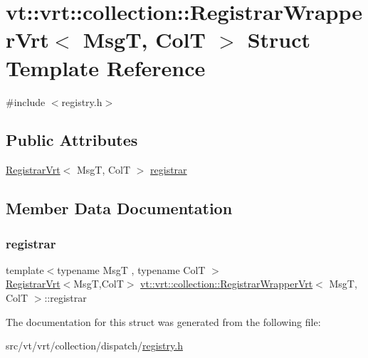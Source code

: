 \hypertarget{structvt_1_1vrt_1_1collection_1_1_registrar_wrapper_vrt}{}\section{vt\+:\+:vrt\+:\+:collection\+:\+:Registrar\+Wrapper\+Vrt$<$ MsgT, ColT $>$ Struct Template Reference}
\label{structvt_1_1vrt_1_1collection_1_1_registrar_wrapper_vrt}


{\ttfamily \#include $<$registry.\+h$>$}

\subsection*{Public Attributes}
\begin{DoxyCompactItemize}
\item 
\hyperlink{structvt_1_1vrt_1_1collection_1_1_registrar_vrt}{Registrar\+Vrt}$<$ MsgT, ColT $>$ \hyperlink{structvt_1_1vrt_1_1collection_1_1_registrar_wrapper_vrt_afc5092f83f5858d4581d93533db68769}{registrar}
\end{DoxyCompactItemize}


\subsection{Member Data Documentation}
\mbox{\label{structvt_1_1vrt_1_1collection_1_1_registrar_wrapper_vrt_afc5092f83f5858d4581d93533db68769}} 
\subsubsection{\texorpdfstring{registrar}{registrar}}
{\footnotesize\ttfamily template$<$typename MsgT , typename ColT $>$ \\
\hyperlink{structvt_1_1vrt_1_1collection_1_1_registrar_vrt}{Registrar\+Vrt}$<$MsgT,ColT$>$ \hyperlink{structvt_1_1vrt_1_1collection_1_1_registrar_wrapper_vrt}{vt\+::vrt\+::collection\+::\+Registrar\+Wrapper\+Vrt}$<$ MsgT, ColT $>$\+::registrar}



The documentation for this struct was generated from the following file\+:\begin{DoxyCompactItemize}
\item 
src/vt/vrt/collection/dispatch/\hyperlink{vrt_2collection_2dispatch_2registry_8h}{registry.\+h}\end{DoxyCompactItemize}

